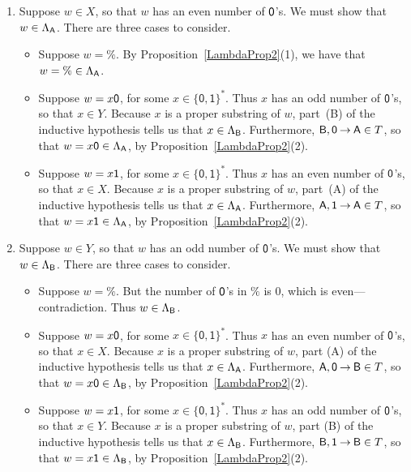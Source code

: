\begin{enumerate}[\quad(A)]
\item Suppose $w\in X$, so that $w$ has an even number of $\mathsf{0}$'s.
  We must show that
  $w\in\Lambda_{\mathsf{A}}$.  There are three cases to consider.
  \begin{itemize}
  \item Suppose $w=\%$.  By Proposition~\ref{LambdaProp2}(1), we have
    that $w=\%\in\Lambda_{\mathsf{A}}$.
  
  \item Suppose $w=x\mathsf{0}$, for some $x\in\{\mathsf{0,1}\}^*$.  Thus
    $x$ has an odd number of $\mathsf{0}$'s, so that $x\in Y$.
    Because $x$ is a proper substring of $w$,  part~(B) of
    the inductive hypothesis tells us that $x\in\Lambda_{\mathsf{B}}$.
    Furthermore, $\mathsf{B},\mathsf{0}\mathbin{\to}\mathsf{A}\in T$, so that
    ${w=x\mathsf{0}}\in\Lambda_{\mathsf{A}}$, by
    Proposition~\ref{LambdaProp2}(2).
  
  \item Suppose $w=x\mathsf{1}$, for some $x\in\{\mathsf{0,1}\}^*$.  Thus
    $x$ has an even number of $\mathsf{0}$'s, so that $x\in X$.
    Because $x$ is a proper
    substring of $w$, part~(A) of the inductive hypothesis tells us
    that $x\in\Lambda_{\mathsf{A}}$.  Furthermore, $\mathsf{A},\mathsf{1}\mathbin{\to}\mathsf{A}\in
    T$, so that $w=x\mathsf{1}\in\Lambda_{\mathsf{A}}$, by
    Proposition~\ref{LambdaProp2}(2).
  \end{itemize}

\item Suppose $w\in Y$, so that $w$ has an odd number of $\mathsf{0}$'s.
  We must show that
  $w\in\Lambda_{\mathsf{B}}$.  There are three cases to consider.
  \begin{itemize}
  \item Suppose $w=\%$.  But the number of $\mathsf{0}$'s in
    $\%$ is $0$, which is even---contradiction.  Thus
    $w\in\Lambda_{\mathsf{B}}$.
  
  \item Suppose $w=x\mathsf{0}$, for some $x\in\{\mathsf{0,1}\}^*$.  Thus
    $x$ has an even number of $\mathsf{0}$'s, so that $x\in X$.
    Because $x$ is a proper
    substring of $w$, part (A) of the inductive hypothesis tells us
    that $x\in\Lambda_{\mathsf{A}}$.  Furthermore, $\mathsf{A},\mathsf{0}\mathbin{\to}\mathsf{B}\in
    T$, so that $w=x\mathsf{0}\in\Lambda_{\mathsf{B}}$, by
    Proposition~\ref{LambdaProp2}(2).
  
  \item Suppose $w=x\mathsf{1}$, for some $x\in\{\mathsf{0,1}\}^*$.  Thus
    $x$ has an odd number of $\mathsf{0}$'s, so that $x\in Y$.
    Because $x$ is a proper
    substring of $w$, part (B) of the inductive hypothesis tells us
    that $x\in\Lambda_{\mathsf{B}}$.  Furthermore, $\mathsf{B},\mathsf{1}\mathbin{\to}\mathsf{B}\in
    T$, so that $w=x\mathsf{1}\in\Lambda_{\mathsf{B}}$, by
    Proposition~\ref{LambdaProp2}(2).
  \end{itemize}
\end{enumerate}

